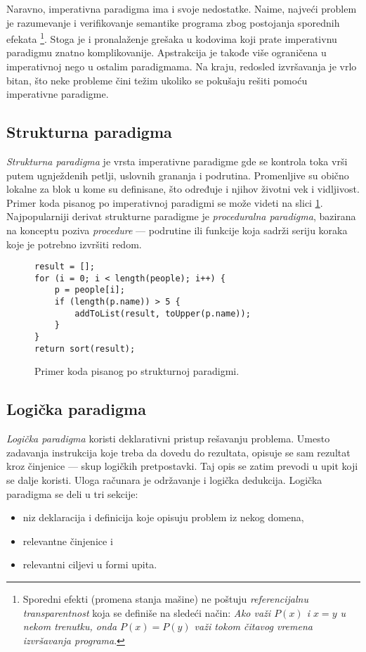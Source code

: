 Naravno, imperativna paradigma ima i svoje nedostatke. Naime, najveći problem je razumevanje i verifikovanje semantike programa zbog postojanja sporednih efekata \footnote{Sporedni efekti (promena stanja mašine) ne poštuju \emph{referencijalnu transparentnost} koja se definiše na sledeći način: \emph{Ako važi $P(x)$ i $x = y$ u nekom trenutku, onda $P(x) = P(y)$ važi tokom čitavog vremena izvršavanja programa}.}. Stoga je i pronalaženje grešaka u kodovima koji prate imperativnu paradigmu znatno komplikovanije. Apstrakcija je takođe više ograničena u imperativnoj nego u ostalim paradigmama. Na kraju, redosled izvršavanja je vrlo bitan, što neke probleme čini težim ukoliko se pokušaju rešiti pomoću imperativne paradigme.

\subsection{Strukturna paradigma}
\label{subsec:ParadigmImperativeStructural}

\emph{Strukturna paradigma} je vrsta imperativne paradigme gde se kontrola toka vrši putem ugnježdenih petlji, uslovnih grananja i podrutina. Promenljive su obično lokalne za blok u kome su definisane, što određuje i njihov životni vek i vidljivost. Primer koda pisanog po imperativnoj paradigmi se može videti na slici \ref{fig:ParadigmStructural}. Najpopularniji derivat strukturne paradigme je \emph{proceduralna paradigma}, bazirana na konceptu poziva \emph{procedure} --- podrutine ili funkcije koja sadrži seriju koraka koje je potrebno izvršiti redom.

\begin{figure}[h!]
\begin{lstlisting}
result = [];
for (i = 0; i < length(people); i++) {
    p = people[i];
    if (length(p.name)) > 5 {
        addToList(result, toUpper(p.name));
    }
}
return sort(result);
\end{lstlisting}
\caption{Primer koda pisanog po strukturnoj paradigmi.}
\label{fig:ParadigmStructural}
\end{figure}


\subsection{Logička paradigma}
\label{subsec:ParadigmLogical}

\emph{Logička paradigma} koristi deklarativni pristup rešavanju problema. Umesto zadavanja instrukcija koje treba da dovedu do rezultata, opisuje se sam rezultat kroz činjenice --- skup logičkih pretpostavki. Taj opis se zatim prevodi u upit koji se dalje koristi. Uloga računara je održavanje i logička dedukcija. Logička paradigma se deli u tri sekcije:
\begin{itemize}
    \item niz deklaracija i definicija koje opisuju problem iz nekog domena,
    \item relevantne činjenice i
    \item relevantni ciljevi u formi upita.
\end{itemize}

